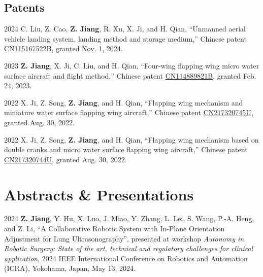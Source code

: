 \documentclass[11pt,letterpaper]{report}
\begin{document}
\subsection*{Patents}
\begin{tablist}	
	\item[2024]   \tab{}C. Liu, Z. Cao, \textbf{Z. Jiang}, R. Xu, X. Ji, and H. Qian, ``Unmanned aerial vehicle landing system, landing method and storage medium,'' Chinese patent \href{https://patents.google.com/patent/CN115167522A/en?oq=CN115167522A}{CN115167522B}, granted Nov. 1, 2024.	
		
	\item[2023]   \tab{}\textbf{Z. Jiang}, X. Ji, C. Liu, and H. Qian, ``Four-wing flapping wing micro water surface aircraft and flight method,'' Chinese patent \href{https://patents.google.com/patent/CN114889821B/en?oq=CN114889821B}{CN114889821B}, granted Feb. 24, 2023.
		
	\item[2022]   \tab{}X. Ji, Z. Song, \textbf{Z. Jiang}, and H. Qian, ``Flapping wing mechanism and miniature water surface flapping wing aircraft,'' Chinese patent \href{https://patents.google.com/patent/CN217320745U/en?oq=CN217320745U}{CN217320745U}, granted Aug. 30, 2022.  
		
	\item[2022]   \tab{}X. Ji, Z. Song, \textbf{Z. Jiang}, and H. Qian, ``Flapping wing mechanism based on double cranks and micro water surface flapping wing aircraft,'' Chinese patent \href{https://patents.google.com/patent/CN217320744U/en?oq=CN217320744U}{CN217320744U}, granted Aug. 30, 2022.  
\end{tablist}
	
	
	
\section*{Abstracts \& Presentations}
\begin{tablist}	
	\item[2024] \tab \textbf{Z. Jiang}, Y. Hu, X. Luo, J. Miao, Y. Zhang, L. Lei, S. Wang, P.-A. Heng, and Z. Li, ``A Collaborative Robotic System with In-Plane Orientation Adjustment for Lung Ultrasonography'', presented at workshop \textit{Autonomy in Robotic Surgery: State of the art, technical and regulatory challenges for clinical application}, 2024 IEEE International Conference on Robotics and Automation (ICRA), Yokohama, Japan, May 13, 2024.
\end{tablist}
	
\end{document}
